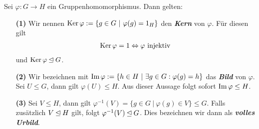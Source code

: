 \begin{sz}\label{skript:3.5}
Sei $\varphi : G \to H$ ein Gruppenhomomorphismus. Dann gelten:
\begin{enumerate}
\item[\textbf{(1)}] 
Wir nennen $\Ker \varphi := \lbrace g \in G \ | \ \varphi(g)= 1_H \rbrace$ den \textbf{\textit{Kern}} von $\varphi$. Für diesen gilt 
\begin{align*}
\operatorname{Ker} \varphi = 1 \Leftrightarrow \varphi \ \text{injektiv}
\end{align*}
und $\operatorname{Ker} \varphi \unlhd G$.
\item[\textbf{(2)}] 
Wir bezeichnen mit $\operatorname{Im} \varphi := \lbrace h \in H \ | \ \exists g \in G : \varphi(g)=h \rbrace$
das \textbf{\textit{Bild}} von $\varphi$.
Sei $U \leq G$, dann gilt $\varphi(U) \leq H$.
Aus dieser Aussage folgt sofort $\operatorname{Im} \varphi \leq H$.
\item[\textbf{(3)}] 
Sei $V \leq H $, dann gilt $\varphi^{-1}(V) = \lbrace g \in G \ | \ \varphi(g) \in V \rbrace \leq G$.
Falls zusätzlich $V \unlhd H$ gilt, folgt $\varphi^{-1}(V) \unlhd G$.
Dies bezeichnen wir dann als \textbf{\textit{volles Urbild}}.
\end{enumerate}
\end{sz}

